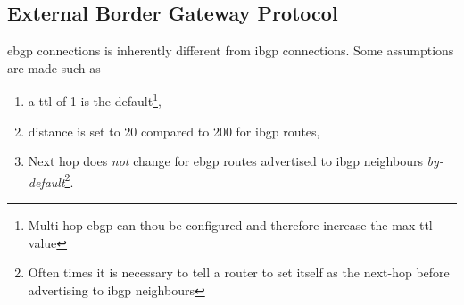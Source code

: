 \subsection[eBGP]{External Border Gateway Protocol}

\gls{ebgp} connections is inherently different from \gls{ibgp} connections. Some assumptions are made such as
\begin{enumerate}
    \item a \gls{ttl} of 1 is the default\footnote{Multi-hop \gls{ebgp} can thou be configured and therefore increase the max-\gls{ttl} value},
    \item distance is set to 20 compared to 200 for \gls{ibgp} routes,
    \item Next hop does \textit{not} change for \gls{ebgp} routes advertised to \gls{ibgp} neighbours \textit{by-default}\footnote{Often times it is necessary to tell a router to set itself as the next-hop before advertising to \gls{ibgp} neighbours}.
\end{enumerate}
